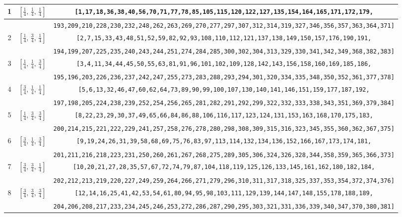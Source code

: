 \documentclass[fleqn,8pt]{jsarticle}
\begin{document}
\begin{longtable}{ccc}
1 & $\left[ \frac{1}{4},\, \frac{1}{4},\, \frac{1}{4} \right]$ & {\tt [1,17,18,36,38,40,56,70,71,77,78,85,105,115,120,122,127,135,154,164,165,171,172,179,} \\ \hline
 &  & {\tt 193,209,210,228,230,232,248,262,263,269,270,277,297,307,312,314,319,327,346,356,357,363,364,371]} \\ \hline
2 & $\left[ \frac{1}{4},\, \frac{3}{4},\, \frac{1}{4} \right]$ & {\tt [2,7,15,33,43,48,51,52,59,82,92,93,108,110,112,121,137,138,149,150,157,176,190,191,} \\ \hline
 &  & {\tt 194,199,207,225,235,240,243,244,251,274,284,285,300,302,304,313,329,330,341,342,349,368,382,383]} \\ \hline
3 & $\left[ \frac{1}{4},\, \frac{1}{4},\, \frac{3}{4} \right]$ & {\tt [3,4,11,34,44,45,50,55,63,81,91,96,101,102,109,128,142,143,156,158,160,169,185,186,} \\ \hline
 &  & {\tt 195,196,203,226,236,237,242,247,255,273,283,288,293,294,301,320,334,335,348,350,352,361,377,378]} \\ \hline
4 & $\left[ \frac{3}{4},\, \frac{1}{4},\, \frac{1}{4} \right]$ & {\tt [5,6,13,32,46,47,60,62,64,73,89,90,99,100,107,130,140,141,146,151,159,177,187,192,} \\ \hline
 &  & {\tt 197,198,205,224,238,239,252,254,256,265,281,282,291,292,299,322,332,333,338,343,351,369,379,384]} \\ \hline
5 & $\left[ \frac{1}{4},\, \frac{3}{4},\, \frac{3}{4} \right]$ & {\tt [8,22,23,29,30,37,49,65,66,84,86,88,106,116,117,123,124,131,153,163,168,170,175,183,} \\ \hline
 &  & {\tt 200,214,215,221,222,229,241,257,258,276,278,280,298,308,309,315,316,323,345,355,360,362,367,375]} \\ \hline
6 & $\left[ \frac{3}{4},\, \frac{1}{4},\, \frac{3}{4} \right]$ & {\tt [9,19,24,26,31,39,58,68,69,75,76,83,97,113,114,132,134,136,152,166,167,173,174,181,} \\ \hline
 &  & {\tt 201,211,216,218,223,231,250,260,261,267,268,275,289,305,306,324,326,328,344,358,359,365,366,373]} \\ \hline
7 & $\left[ \frac{3}{4},\, \frac{3}{4},\, \frac{1}{4} \right]$ & {\tt [10,20,21,27,28,35,57,67,72,74,79,87,104,118,119,125,126,133,145,161,162,180,182,184,} \\ \hline
 &  & {\tt 202,212,213,219,220,227,249,259,264,266,271,279,296,310,311,317,318,325,337,353,354,372,374,376]} \\ \hline
8 & $\left[ \frac{3}{4},\, \frac{3}{4},\, \frac{3}{4} \right]$ & {\tt [12,14,16,25,41,42,53,54,61,80,94,95,98,103,111,129,139,144,147,148,155,178,188,189,} \\ \hline
 &  & {\tt 204,206,208,217,233,234,245,246,253,272,286,287,290,295,303,321,331,336,339,340,347,370,380,381]} \\
\end{longtable}
\end{document}

